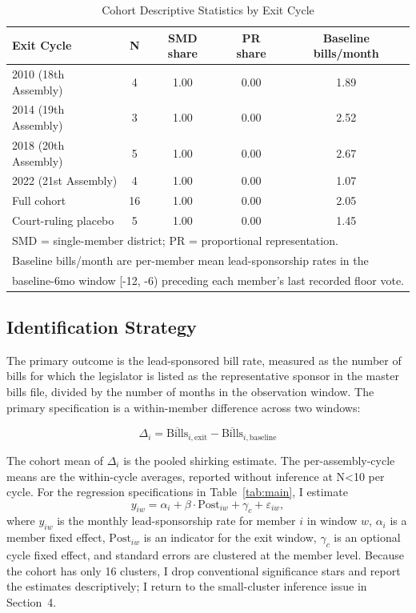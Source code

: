 \documentclass[11pt]{article}
\begin{document}
\begin{table}[H]
\centering
\caption{Cohort Descriptive Statistics by Exit Cycle}
\label{tab:desc}
\begin{tabular}{lcccc}
\toprule
Exit Cycle & N & SMD share & PR share & Baseline bills/month \\
\midrule
2010 (18th Assembly) & 4 & 1.00 & 0.00 & 1.89 \\
2014 (19th Assembly) & 3 & 1.00 & 0.00 & 2.52 \\
2018 (20th Assembly) & 5 & 1.00 & 0.00 & 2.67 \\
2022 (21st Assembly) & 4 & 1.00 & 0.00 & 1.07 \\
\midrule
Full cohort & 16 & 1.00 & 0.00 & 2.05 \\
Court-ruling placebo & 5 & 1.00 & 0.00 & 1.45 \\
\bottomrule
\multicolumn{5}{l}{\footnotesize SMD = single-member district; PR = proportional representation.} \\
\multicolumn{5}{l}{\footnotesize Baseline bills/month are per-member mean lead-sponsorship rates in the} \\
\multicolumn{5}{l}{\footnotesize baseline-6mo window [-12, -6) preceding each member's last recorded floor vote.} \\
\end{tabular}
\end{table}

\subsection{Identification Strategy}

The primary outcome is the lead-sponsored bill rate, measured as the number of bills for which the legislator is listed as the representative sponsor in the master bills file, divided by the number of months in the observation window. The primary specification is a within-member difference across two windows:

\begin{equation}
\Delta_i = \overline{\text{Bills}}_{i, \text{exit}} - \overline{\text{Bills}}_{i, \text{baseline}}
\label{eq:diff}
\end{equation}

The cohort mean of $\Delta_i$ is the pooled shirking estimate. The per-assembly-cycle means are the within-cycle averages, reported without inference at N<10 per cycle. For the regression specifications in Table~\ref{tab:main}, I estimate
\begin{equation}
y_{iw} = \alpha_i + \beta \cdot \text{Post}_{iw} + \gamma_c + \varepsilon_{iw},
\label{eq:reg}
\end{equation}
where $y_{iw}$ is the monthly lead-sponsorship rate for member $i$ in window $w$, $\alpha_i$ is a member fixed effect, $\text{Post}_{iw}$ is an indicator for the exit window, $\gamma_c$ is an optional cycle fixed effect, and standard errors are clustered at the member level. Because the cohort has only 16 clusters, I drop conventional significance stars and report the estimates descriptively; I return to the small-cluster inference issue in Section~4.
\end{document}
